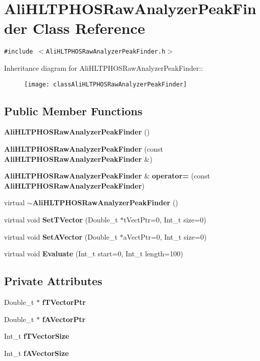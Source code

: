 \section{Ali\-HLTPHOSRaw\-Analyzer\-Peak\-Finder Class Reference}
\label{classAliHLTPHOSRawAnalyzerPeakFinder}
{\tt \#include $<$Ali\-HLTPHOSRaw\-Analyzer\-Peak\-Finder.h$>$}

Inheritance diagram for Ali\-HLTPHOSRaw\-Analyzer\-Peak\-Finder::\begin{figure}[H]
\begin{center}
\leavevmode
\texttt{[image: classAliHLTPHOSRawAnalyzerPeakFinder]}
\end{center}
\end{figure}
\subsection*{Public Member Functions}
\begin{CompactItemize}
\item 
{\bf Ali\-HLTPHOSRaw\-Analyzer\-Peak\-Finder} ()
\item 
{\bf Ali\-HLTPHOSRaw\-Analyzer\-Peak\-Finder} (const {\bf Ali\-HLTPHOSRaw\-Analyzer\-Peak\-Finder} \&)
\item 
{\bf Ali\-HLTPHOSRaw\-Analyzer\-Peak\-Finder} \& {\bf operator=} (const {\bf Ali\-HLTPHOSRaw\-Analyzer\-Peak\-Finder})
\item 
virtual {\bf $\sim$Ali\-HLTPHOSRaw\-Analyzer\-Peak\-Finder} ()
\item 
virtual void {\bf Set\-TVector} (Double\_\-t $\ast$t\-Vect\-Ptr=0, Int\_\-t size=0)
\item 
virtual void {\bf Set\-AVector} (Double\_\-t $\ast$a\-Vect\-Ptr=0, Int\_\-t size=0)
\item 
virtual void {\bf Evaluate} (Int\_\-t start=0, Int\_\-t length=100)
\end{CompactItemize}
\subsection*{Private Attributes}
\begin{CompactItemize}
\item 
Double\_\-t $\ast$ {\bf f\-TVector\-Ptr}
\item 
Double\_\-t $\ast$ {\bf f\-AVector\-Ptr}
\item 
Int\_\-t {\bf f\-TVector\-Size}
\item 
Int\_\-t {\bf f\-AVector\-Size}
\end{CompactItemize}


